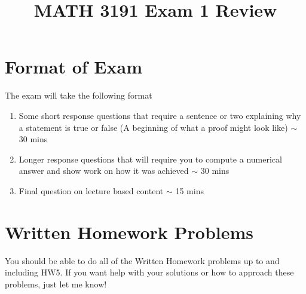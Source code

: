 \documentclass[12pt]{exam}
\title{MATH 3191 Exam 1 Review}
\date{}
\begin{document}
\maketitle
\section{Format of Exam}
The exam will take the following format
\begin{enumerate}
    \item Some short response questions that require a sentence or two explaining why a statement
        is true or false (A beginning of what a proof might look like) $\sim$ 30 mins 
    \item Longer response questions that will require you to compute a numerical answer and show work
        on how it was achieved $\sim$ 30 mins
    \item Final question on lecture based content $\sim$ 15 mins
\end{enumerate}
\section{Written Homework Problems}
You should be able to do all of the Written Homework problems up to and including HW5. If you want
help with your solutions or how to approach these problems, just let me know!
\end{document}
